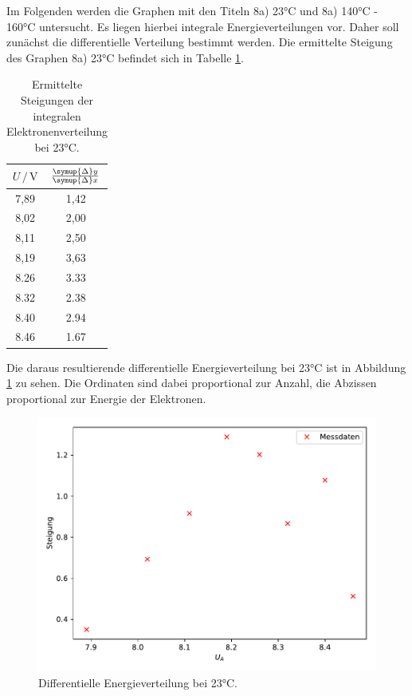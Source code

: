 Im Folgenden werden die Graphen mit den Titeln 8a) 23°C und 8a) 140°C - 160°C untersucht. Es liegen 
hierbei integrale Energieverteilungen vor. Daher soll zunächst die differentielle Verteilung bestimmt
werden. Die ermittelte Steigung des Graphen 8a) 23°C befindet sich in Tabelle \ref{tab:23}.

\begin{table}
  \centering
  \caption{Ermittelte Steigungen der integralen Elektronenverteilung bei 23°C.}
  \label{tab:23}
  \begin{tabular}{c c }
  \toprule
  $ U \,/\, \si{\volt} $ & $\frac{\symup{\Delta}y}{\symup{\Delta}x}$\\
  \midrule 
  7,89 & 1,42\\
  8,02 & 2,00\\
  8,11 & 2,50\\
  8,19 & 3,63\\
  8.26 & 3.33\\
  8.32 & 2.38\\
  8.40 & 2.94\\
  8.46 & 1.67\\
  \bottomrule
  \end{tabular}
  \end{table}

Die daraus resultierende differentielle Energieverteilung bei 23°C ist in Abbildung \ref{fig:plot1} zu sehen. 
Die Ordinaten sind dabei proportional zur Anzahl, die Abzissen proportional zur Energie der Elektronen. 

\begin{figure}
  \centering
  \includegraphics{content/plot1.pdf}
  \caption{Differentielle Energieverteilung bei 23°C.}
  \label{fig:plot1}
\end{figure}

